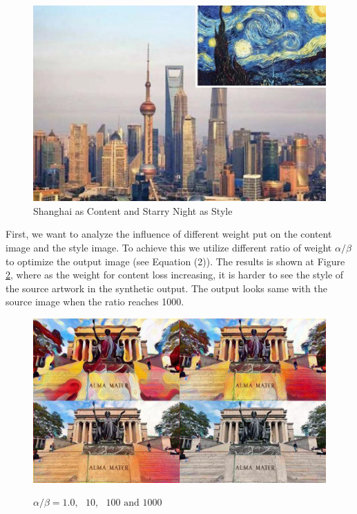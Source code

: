 \documentclass[10pt,twocolumn,letterpaper]{article}
\begin{document}
\begin{figure}[t]
\begin{center}
\includegraphics[width=0.6\linewidth]{images/shanghai.jpg}
\end{center}
\caption{Shanghai as Content and Starry Night as Style}
\label{fig:long}
\label{fig:onecol}
\label{fig_shn_star}
\end{figure}

First, we want to analyze the influence of different weight put on the content image and the style image. To achieve this we utilize different ratio of weight $\alpha / \beta$ to optimize the output image (see Equation (2)). The results is shown at Figure \ref{fig_ab}, where as the weight for content loss increasing, it is harder to see the style of the source artwork in the synthetic output. The output looks same with the source image when the ratio reaches 1000. 



\begin{figure}[t]
\begin{center}
\includegraphics[width=0.9\linewidth]{images/merge_ab.jpg}
\caption{$\alpha/\beta=1.0,\text{ }10,\text{ }100\text{ and }1000$}
\label{fig:long}
\label{fig:onecol}
\label{fig_ab}
\end{center}
\end{figure}
\end{document}
